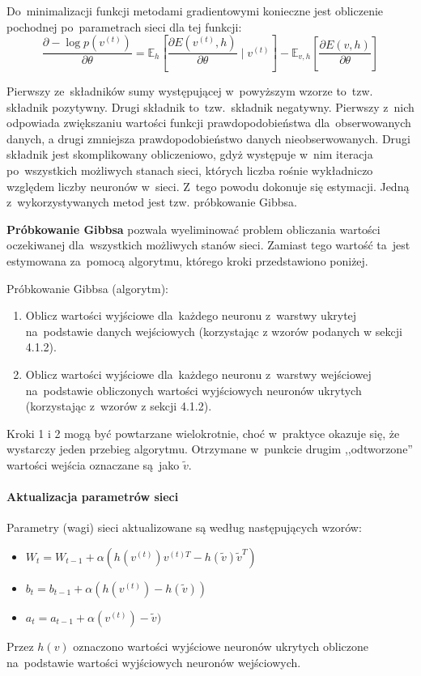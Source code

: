 Do~minimalizacji funkcji metodami gradientowymi konieczne jest obliczenie pochodnej po~parametrach sieci
dla tej funkcji:
$$\frac{\partial-\log{p(v^{(t)})}}{\partial{\theta}}=\mathbb{E}_h[\frac{\partial{E(v^{(t)},h)}}{\partial{\theta}}\mid{v^{(t)}}]-\mathbb{E}_{v,h}[\frac{\partial{E(v,h)}}{\partial{\theta}}]$$

Pierwszy ze~składników sumy występującej w~powyższym wzorze to~tzw. składnik pozytywny. Drugi składnik
to~tzw.~składnik negatywny. Pierwszy z~nich odpowiada zwiększaniu wartości funkcji prawdopodobieństwa
dla~obserwowanych danych, a drugi zmniejsza prawdopodobieństwo danych nieobserwowanych. Drugi składnik jest
skomplikowany obliczeniowo, gdyż występuje w~nim iteracja po~wszystkich możliwych stanach sieci, których
liczba rośnie wykładniczo względem liczby neuronów w~sieci. Z~tego powodu dokonuje się estymacji. Jedną
z~wykorzystywanych metod jest tzw. próbkowanie Gibbsa. 

\textbf{Próbkowanie Gibbsa} pozwala wyeliminować problem obliczania wartości oczekiwanej dla~wszystkich
możliwych stanów sieci. Zamiast tego wartość ta~jest estymowana za~pomocą algorytmu, którego kroki
przedstawiono poniżej.

Próbkowanie Gibbsa (algorytm):
\begin{enumerate}
  \item Oblicz wartości wyjściowe dla~każdego neuronu z~warstwy ukrytej na~podstawie danych wejściowych
  (korzystając z wzorów podanych w sekcji 4.1.2).
  \item Oblicz wartości wyjściowe dla~każdego neuronu z~warstwy wejściowej na~podstawie obliczonych wartości
  wyjściowych neuronów ukrytych (korzystając z~wzorów z sekcji 4.1.2).
\end{enumerate}

Kroki 1 i 2 mogą być powtarzane wielokrotnie, choć w~praktyce okazuje się, że wystarczy jeden
przebieg algorytmu. Otrzymane w~punkcie drugim ,,odtworzone'' wartości wejścia oznaczane są~jako $\tilde{v}$.

\paragraph{Aktualizacja parametrów sieci}
Parametry (wagi) sieci aktualizowane są według następujących wzorów:
\begin{itemize}
  \item $W_t=W_{t-1}+\alpha(h(v^{(t)})v^{(t)T}-h(\tilde{v})\tilde{v}^{T})$
  \item $b_t=b_{t-1}+\alpha(h(v^{(t)})-h(\tilde{v}))$
  \item $a_t=a_{t-1}+\alpha(v^{(t)})-\tilde{v})$
\end{itemize}
\vspace{1cm}

Przez $h(v)$ oznaczono wartości wyjściowe neuronów ukrytych obliczone na~podstawie wartości wyjściowych
neuronów wejściowych.